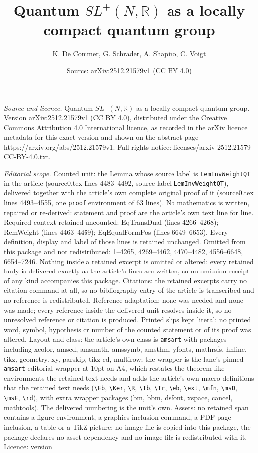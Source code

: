 \documentclass[10pt,a4paper]{amsart}
\title[Quantum $SL^+(N,\mathbb{R})$ as a locally compact quantum gr]{Quantum $SL^+(N,\mathbb{R})$ as a locally compact quantum group}
\author{K. De Commer, G. Schrader, A. Shapiro, C. Voigt}
\date{Source: arXiv:2512.21579v1 (CC BY 4.0)}
\begin{document}
\maketitle

\noindent\emph{Source and licence.} Quantum $SL^+(N,\mathbb{R})$ as a locally compact quantum group. Version arXiv:2512.21579v1 (CC BY 4.0), distributed under the Creative Commons Attribution 4.0 International licence, as recorded in the arXiv licence metadata for this exact version and shown on the abstract page https://arxiv.org/abs/2512.21579v1. Full rights notice: licenses/arxiv-2512.21579-CC-BY-4.0.txt.\par\smallskip

\noindent\textit{Editorial scope.} Counted unit: the Lemma whose source label is \texttt{LemInvWeightQT} in the article (source0.tex lines 4483--4492, source label \texttt{LemInvWeightQT}), delivered together with the article's own complete original proof of it (source0.tex lines 4493--4555, one \texttt{proof} environment of 63 lines). No mathematics is written, repaired or re-derived: statement and proof are the article's own text line for line. Required context retained uncounted: EqTransDual (lines 4266--4268); RemWeight (lines 4463--4469); EqEqualFormPos (lines 6649--6653). Every definition, display and label of those lines is retained unchanged. Omitted from this package and not redistributed: 1--4265, 4269--4462, 4470--4482, 4556--6648, 6654--7246. Nothing inside a retained excerpt is omitted or altered: every retained body is delivered exactly as the article's lines are written, so no omission receipt of any kind accompanies this package. Citations: the retained excerpts carry no citation command at all, so no bibliography entry of the article is transcribed and no reference is redistributed. Reference adaptation: none was needed and none was made; every reference inside the delivered unit resolves inside it, so no unresolved reference or citation is produced. Printed slips kept literal: no printed word, symbol, hypothesis or number of the counted statement or of its proof was altered. Layout and class: the article's own class is \texttt{amsart} with packages including xcolor, amscd, amsmath, amssymb, amsthm, yfonts, mathrsfs, hhline, tikz, geometry, xy, parskip, tikz-cd, multirow; the wrapper is the lane's pinned \texttt{amsart} editorial wrapper at 10pt on A4, which restates the theorem-like environments the retained text needs and adds the article's own macro definitions that the retained text needs (\texttt{\textbackslash Eb}, \texttt{\textbackslash Ker}, \texttt{\textbackslash R}, \texttt{\textbackslash Tb}, \texttt{\textbackslash Tr}, \texttt{\textbackslash eb}, \texttt{\textbackslash ext}, \texttt{\textbackslash mfn}, \texttt{\textbackslash msD}, \texttt{\textbackslash msE}, \texttt{\textbackslash rd}), with extra wrapper packages (bm, bbm, dsfont, xspace, cancel, mathtools). The delivered numbering is the unit's own. Assets: no retained span contains a figure environment, a graphics-inclusion command, a PDF-page inclusion, a table or a TikZ picture; no image file is copied into this package, the package declares no asset dependency and no image file is redistributed with it. Licence: version 
\end{document}
